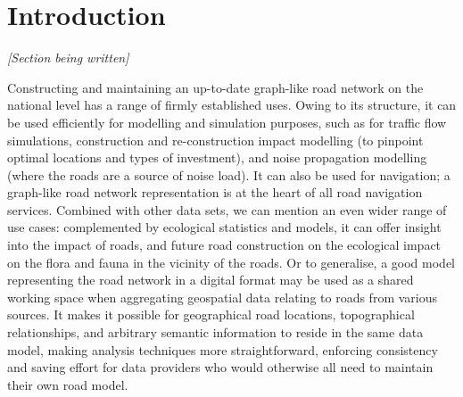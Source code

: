 
\chapter{Introduction}
\label{chap:i}

\emph{[Section being written]}

Constructing and maintaining an up-to-date graph-like road network on the national level has a range of firmly established uses. Owing to its structure, it can be used efficiently for modelling and simulation purposes, such as for traffic flow simulations, construction and re-construction impact modelling (to pinpoint optimal locations and types of investment), and noise propagation modelling (where the roads are a source of noise load). It can also be used for navigation; a graph-like road network representation  is at the heart of all road navigation services. Combined with other data sets, we can mention an even wider range of use cases: complemented by ecological statistics and models, it can offer insight into the impact of roads, and future road construction on the ecological impact on the flora and fauna in the vicinity of the roads. Or to generalise, a good model representing the road network in a digital format may be used as a shared working space when aggregating geospatial data relating to roads from various sources. It makes it possible for geographical road locations, topographical relationships, and arbitrary semantic information to reside in the same data model, making analysis techniques more straightforward, enforcing consistency and saving effort for data providers who would otherwise all need to maintain their own road model.
